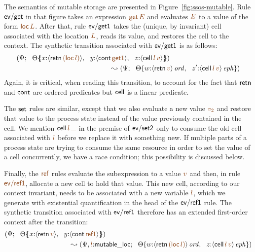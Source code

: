 The semantics of mutable storage are presented in
Figure~\ref{fig:ssos-mutable}. Rule ${\sf ev/get}$ in that figure
takes an expression $\lf{{\sf get}\,E}$ and evaluates $\lf E$ to a
value of the form $\lf{{\sf loc}\,L}$. After that, rule ${\sf
  ev/get1}$ takes the (unique, by invariant) cell associated with the
location $\lf L$, reads its value, and restores the cell to the
context. The synthetic transition associated with ${\sf ev/get1}$ is
as follows:
\begin{align*}
(\Psi&;  ~~ \frameoff{\Theta}{x{:}{\susp{{\sf retn}\,\lf{({\sf loc}\,l)}}},
 ~~ y{:}{\susp{{\sf cont}\,\lf{\sf get1}}}, 
 ~~ z{:}{\susp{{\sf cell}\,\lf{l}\,\lf{v}}}})\\
& \qquad \qquad\qquad\qquad\qquad\qquad~ \leadsto 
(\Psi; ~~ \tackon{\Theta}{w{:}\istrue{\susp{{\sf retn}\,\lf{v}}},
 ~~ z'{:}\iseph{\susp{{\sf cell}\,\lf{l}\,\lf{v}}}})
\end{align*}
Again, it is critical, when reading this transition, to account for the fact
that ${\sf retn}$ and ${\sf cont}$ are ordered predicates but ${\sf
  cell}$ is a linear predicate.

The ${\sf set}$ rules are similar, except that we also evaluate a new
value $\lf{v_2}$ and restore that value to the process state instead
of the value previously contained in the cell. We mention ${\sf
  cell}\,\lf{l}\,\lf{\_}$ in the premise of ${\sf ev/set2}$ only to
consume the old cell associated with $\lf{l}$ before we replace it
with something new. If multiple parts of a process state are trying to
consume the same resource in order to set the value of a cell
concurrently, we have a race condition; this possibility is discussed
below.

Finally, the $\lf{\sf ref}$ rules evaluate the subexpression to a value
$\lf{v}$ and then, in rule $\lf{\sf ev/ref1}$, allocate a new cell to hold
that value. This new cell, according to our context invariant, needs
to be associated with a new variable $\lf{l}$, which we generate with
existential quantification in the head of the ${\sf ev/ref1}$ rule.
The synthetic transition associated with ${\sf ev/ref1}$ therefore has
an extended first-order context after the transition:
\begin{align*}
(\Psi&; ~~ \frameoff{\Theta}{x{:}\susp{{\sf retn}\,\lf{v}}, ~~ y{:}\susp{{\sf cont}\,\lf{\sf ref1}}})
\\
& \qquad\qquad\qquad\qquad~\leadsto 
(\Psi, \lf{l}{:}{\sf mutable\_loc}; ~~ \tackon{\Theta}{w{:}\istrue{\susp{{\sf retn}\,\lf{({\sf loc}\,l)}}}, ~~
z{:}\iseph{\susp{{\sf cell}\,\lf{l}\,\lf{v}}}})
\end{align*}

